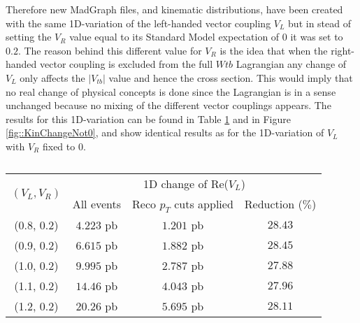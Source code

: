 Therefore new MadGraph files, and kinematic distributions, have been created with the same 1D-variation of the left-handed vector coupling $V_L$ but in stead of setting the $V_R$ value equal to its Standard Model expectation of $0$ it was set to $0.2$. The reason behind this different value for $V_R$ is the idea that when the right-handed vector coupling is excluded from the full $Wtb$ Lagrangian any change of $V_L$ only affects the $\vert V_{tb} \vert$ value and hence the cross section. This would imply that no real change of physical concepts is done since the Lagrangian is in a sense unchanged because no mixing of the different vector couplings appears.
The results for this 1D-variation can be found in Table \ref{table::XSChangeAccVLNot0} and in Figure \ref{fig::KinChangeNot0}, and show identical results as for the 1D-variation of $V_L$ with $V_R$ fixed to $0$. 
\begin{table}[h!]
 \centering
 \begin{tabular}{|c|c|c|c|}
  \hline
  \multirow{2}{*}{$(V_L,V_R)$} 	&  \multicolumn{3}{|c|}{1D change of Re($V_L$)}				\\
					&  All events	& Reco $p_T$ cuts applied	& Reduction ($\%$) 	\\
  \hline
    (0.8, 0.2) 				& $4.223$ pb	& $1.201$ pb			& $28.43$ 		\\
    (0.9, 0.2)				& $6.615$ pb	& $1.882$ pb			& $28.45$		\\
    (1.0, 0.2)				& $9.995$ pb	& $2.787$ pb			& $27.88$ 		\\
    (1.1, 0.2)				& $14.46$ pb	& $4.043$ pb			& $27.96$ 		\\
    (1.2, 0.2)				& $20.26$ pb	& $5.695$ pb			& $28.11$ 		\\
  \hline 
 \end{tabular} 
 \caption{} \label{table::XSChangeAccVLNot0}
\end{table}

